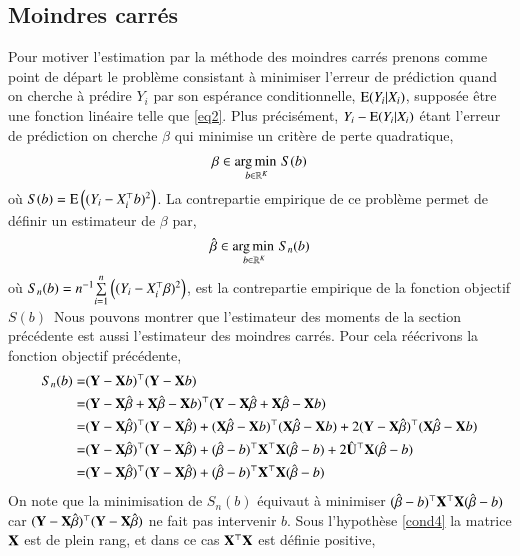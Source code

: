 \documentclass[10pt, reqno]{amsart}
\begin{document}
\subsection{Moindres carrés}
Pour motiver l'estimation par la méthode des moindres carrés prenons comme point de départ 
le problème consistant à minimiser l'erreur de prédiction quand on cherche 
à prédire $Y_i$ par son espérance conditionnelle, $\operatorname{E}(Y_i|X_i)$, supposée être une fonction linéaire telle que \eqref{eq2}. Plus précisément, $Y_i - \operatorname{E}(Y_i|X_i)$ étant l'erreur de prédiction  on cherche $\beta$ qui minimise un critère de perte quadratique,
\begin{align*}
\beta \in \argmin_{b\in \R^K}S(b)
\end{align*}
où $S(b) =\operatorname{E}\left((Y_i - X_i^\top b)^2\right)$.
La contrepartie empirique de ce problème permet de définir un estimateur de $\beta$ par,
\begin{align*}
\hat{\beta} \in \argmin_{b\in \R^K}S_n(b)
\end{align*}
où $S_n(b)=n^{-1}\underset{i=1}{\overset{n}{\sum}}\left((Y_i - X_i^\top\beta)^2\right)$, est la contrepartie empirique de la fonction objectif $S(b)$\
Nous pouvons montrer que l'estimateur des moments de la section précédente est aussi l'estimateur des moindres carrés. Pour cela réécrivons la fonction objectif précédente,
\begin{align*}
S_n(b) = & (\mathbf Y - \mathbf X b)^\top (\mathbf Y - \mathbf X b)\\
=&(\mathbf Y - \mathbf X \hat{\beta}+ \mathbf X \hat{\beta}  - \mathbf X b)^\top (\mathbf Y - \mathbf X \hat{\beta}+ \mathbf X \hat{\beta} - \mathbf X b)\\
=&(\mathbf Y - \mathbf X \hat{\beta})^\top(\mathbf Y - \mathbf X \hat{\beta}) +(\mathbf X \hat{\beta} - \mathbf X b)^\top (\mathbf X \hat{\beta} - \mathbf X b)+ 2(\mathbf Y-\mathbf X \hat{\beta})^\top(\mathbf X \hat{\beta}-\mathbf X b)\\
=&(\mathbf Y - \mathbf X \hat{\beta})^\top(\mathbf Y - \mathbf X \hat{\beta}) + (\hat{\beta}-b)^\top \mathbf X ^\top\mathbf X  (\hat{\beta}-b) 
+ 2\hat{\mathbf U}^\top \mathbf X (\hat{\beta}-b)\\
=&(\mathbf Y - \mathbf X \hat{\beta})^\top(\mathbf Y - \mathbf X \hat{\beta}) + (\hat{\beta}-b)^\top \mathbf X ^\top\mathbf X  (\hat{\beta}-b) 
\end{align*}
On note que la minimisation de $S_n(b)$ équivaut à minimiser $(\hat{\beta}-b)^\top \mathbf X ^\top\mathbf X  (\hat{\beta}-b)$ car $(\mathbf Y - \mathbf X \hat{\beta})^\top(\mathbf Y - \mathbf X \hat{\beta})$ ne fait pas intervenir $b$.  Sous l'hypothèse \eqref{cond4} la matrice $\mathbf X $ est de plein rang, et dans ce cas $\mathbf X ^\top\mathbf X $ est définie positive,
\end{document}
